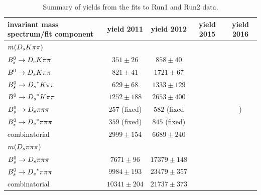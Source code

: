 \begin{table}[h]
\centering
\begin{tabular}{l c c c c}
invariant mass spectrum/fit component & yield 2011 & yield 2012  & yield 2015  & yield 2016\\
\hline \hline
$m({{D}_{s}}{K}{\pi}{\pi})$    &                  &       &           &\\
\hline
${{B}^0_{s}}\rightarrow{\ensuremath{{D}_{s}}}{\ensuremath{K}}{\ensuremath{\pi}}{\ensuremath{\pi}}$    &  $351 \pm 26$    &  $858 \pm 40$ & &\\
${{B}^0}\rightarrow{\ensuremath{{D}_{s}}}{\ensuremath{K}}{\ensuremath{\pi}}{\ensuremath{\pi}}$    &  $821 \pm 41$    &  $1721 \pm 67$ & &\\
${{B}^0_{s}}\rightarrow{\ensuremath{{D}_{s}}}^{*}{K}{\pi}{\pi}$ &  $629 \pm 68$   &  $1333 \pm 129$ & &\\
${{B}^0}\rightarrow{\ensuremath{{D}_{s}}}^{*}{K}{\pi}{\pi}$ &  $1252 \pm 188$ &  $2653 \pm 400$ & &\\
${{B}^0_{s}}\rightarrow{\ensuremath{{D}_{s}}}{\ensuremath{\pi}}{\ensuremath{\pi}}{\ensuremath{\pi}}$    &  $257$ (fixed)   & $582$ (fixed & &)\\
${{B}^0_{s}}\rightarrow{\ensuremath{{D}_{s}}}^{*}{\pi}{\pi}{\pi}$ &  $359$ (fixed)  & $845$ (fixed) & &\\
combinatorial                 &  $2999 \pm 154$  & $6689 \pm 240$ & &\\
\hline \hline
$m({{D}_{s}}{\pi}{\pi}{\pi})$       &                  &    &           & \\
\hline
${{B}^0_{s}}\rightarrow{\ensuremath{{D}_{s}}}{\ensuremath{\pi}}{\ensuremath{\pi}}{\ensuremath{\pi}}$    &  $7671 \pm 96$  &  $17379 \pm 148$ & &\\
${{B}^0_{s}}\rightarrow{\ensuremath{{D}_{s}}}^{*}{\pi}{\pi}{\pi}$ & $9984 \pm 193$  & $23479 \pm 357$ & &\\
combinatorial                 & $10341 \pm 204$  & $21737 \pm 373$ & &\\
\hline
\end{tabular}
\caption{Summary of yields from the fits to Run1 and Run2 data.}
\label{tab: SigYields}
\end{table}



